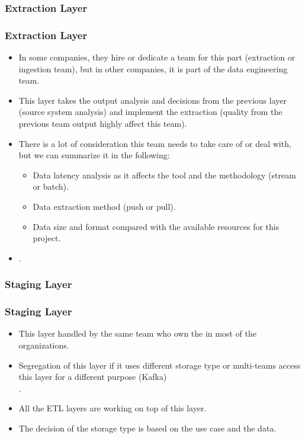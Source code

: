 
\subsubsection{Extraction Layer}

\begin{frame}
    \frametitle{Extraction Layer}
    \begin{itemize}[<+->]
		\item In some companies, they hire or dedicate a team for this part (extraction or ingestion team), but in other companies, it is part of the data engineering team.
		\item This layer takes the output analysis and decisions from the previous layer (source system analysis) and implement the extraction (quality from the previous team output highly affect this team).
		\item There is a lot of consideration this team needs to take care of or deal with, but we can summarize it in the following:
		\begin{itemize}[<+->]
			\item Data latency analysis as it affects the tool and the methodology (stream or batch).
			\item Data extraction method (push or pull).
			\item Data size and format compared with the available resources for this project.
	    \end{itemize}
        \item {}.
    \end{itemize}
\end{frame}


\subsubsection{Staging Layer}
\begin{frame}
    \frametitle{Staging Layer}
    \begin{itemize}[<+->]
        \item This layer handled by the same team who own the  in most of the organizations.
        \item Segregation of this layer if it uses different storage type or multi-teams access this layer for a different purpose \forexample (Kafka)\\ .
        \item All the ETL layers are working on top of this layer.
        \item The decision of the storage type is based on the use case and the data.

    \end{itemize}

\end{frame}

